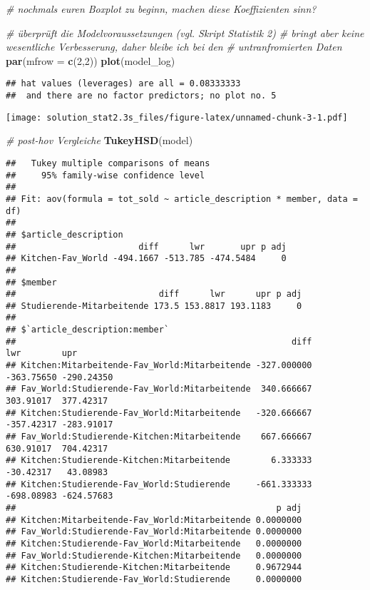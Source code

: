 \documentclass[
]{article}
\newenvironment{Shaded}{\begin{snugshade}}{\end{snugshade}}
\newcommand{\CommentTok}[1]{\textcolor[rgb]{0.56,0.35,0.01}{\textit{#1}}}
\newcommand{\DataTypeTok}[1]{\textcolor[rgb]{0.13,0.29,0.53}{#1}}
\newcommand{\DecValTok}[1]{\textcolor[rgb]{0.00,0.00,0.81}{#1}}
\newcommand{\KeywordTok}[1]{\textcolor[rgb]{0.13,0.29,0.53}{\textbf{#1}}}
\newcommand{\NormalTok}[1]{#1}
\begin{document}
\begin{Shaded}
\begin{Highlighting}[]
\CommentTok{# nochmals euren Boxplot zu beginn, machen diese Koeffizienten sinn?}

\CommentTok{# überprüft die Modelvoraussetzungen (vgl. Skript Statistik 2)}
\CommentTok{# bringt aber keine wesentliche Verbesserung, daher bleibe ich bei den }
\CommentTok{# untranfromierten Daten}
\KeywordTok{par}\NormalTok{(}\DataTypeTok{mfrow =} \KeywordTok{c}\NormalTok{(}\DecValTok{2}\NormalTok{,}\DecValTok{2}\NormalTok{))}
\KeywordTok{plot}\NormalTok{(model_log)}
\end{Highlighting}
\end{Shaded}

\begin{verbatim}
## hat values (leverages) are all = 0.08333333
##  and there are no factor predictors; no plot no. 5
\end{verbatim}

\texttt{[image: solution\_stat2.3s\_files/figure-latex/unnamed-chunk-3-1.pdf]}

\begin{Shaded}
\begin{Highlighting}[]
\CommentTok{# post-hov Vergleiche}
\KeywordTok{TukeyHSD}\NormalTok{(model)}
\end{Highlighting}
\end{Shaded}

\begin{verbatim}
##   Tukey multiple comparisons of means
##     95% family-wise confidence level
## 
## Fit: aov(formula = tot_sold ~ article_description * member, data = df)
## 
## $article_description
##                        diff      lwr       upr p adj
## Kitchen-Fav_World -494.1667 -513.785 -474.5484     0
## 
## $member
##                            diff      lwr      upr p adj
## Studierende-Mitarbeitende 173.5 153.8817 193.1183     0
## 
## $`article_description:member`
##                                                      diff        lwr        upr
## Kitchen:Mitarbeitende-Fav_World:Mitarbeitende -327.000000 -363.75650 -290.24350
## Fav_World:Studierende-Fav_World:Mitarbeitende  340.666667  303.91017  377.42317
## Kitchen:Studierende-Fav_World:Mitarbeitende   -320.666667 -357.42317 -283.91017
## Fav_World:Studierende-Kitchen:Mitarbeitende    667.666667  630.91017  704.42317
## Kitchen:Studierende-Kitchen:Mitarbeitende        6.333333  -30.42317   43.08983
## Kitchen:Studierende-Fav_World:Studierende     -661.333333 -698.08983 -624.57683
##                                                   p adj
## Kitchen:Mitarbeitende-Fav_World:Mitarbeitende 0.0000000
## Fav_World:Studierende-Fav_World:Mitarbeitende 0.0000000
## Kitchen:Studierende-Fav_World:Mitarbeitende   0.0000000
## Fav_World:Studierende-Kitchen:Mitarbeitende   0.0000000
## Kitchen:Studierende-Kitchen:Mitarbeitende     0.9672944
## Kitchen:Studierende-Fav_World:Studierende     0.0000000
\end{verbatim}
\end{document}
